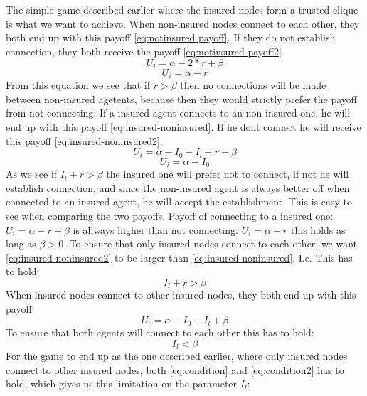 The simple game described earlier where the insured nodes form a trusted clique is what we want to achieve. 
When non-insured nodes connect to each other, they both end up with this payoff \ref{eq:notinsured payoff}. If they do not establish connection, they both receive the payoff \ref{eq:notinsured payoff2}.
\begin{equation}
U_{i}=\alpha - 2*r +\beta
\label{eq:notinsured payoff}
\end{equation}
\begin{equation}
U_{i}=\alpha - r
\label{eq:notinsured payoff2}
\end{equation}
From this equation we see that if $r>\beta$ then no connections will be made between non-insured agetents, because then they would strictly prefer the payoff from not connecting.
If a insured agent connects to an non-insured one, he will end up with this payoff \ref{eq:insured-noninsured}. If he dont connect he will receive this payoff \ref{eq:insured-noninsured2}.
\begin{equation}
U_{i}=\alpha - I_{0} - I_{l} - r + \beta
\label{eq:insured-noninsured}
\end{equation}
\begin{equation}
U_{i}=\alpha - I_{0}
\label{eq:insured-noninsured2}
\end{equation}
As we see if $I_{l}+r>\beta$ the insured one will prefer not to connect, if not he will establish connection, and since the non-insured agent is always better off when connected to an insured agent, he will accept the establishment. This is easy to see when comparing the two payoffs. Payoff of connecting to a insured one: $U_{i}=\alpha - r + \beta$ is allways higher than not connecting: $U_{i}=\alpha - r$ this holds as long as $\beta>0$.
To ensure that only insured nodes connect to each other, we want \ref{eq:insured-noninsured2} to be larger than \ref{eq:insured-noninsured}. I.e. This has to hold:
\begin{equation}
I_{l}+r>\beta
\label{eq:condition}
\end{equation}
When insured nodes connect to other insured nodes, they both end up with this payoff:
\begin{equation}
U_{i}=\alpha - I_{0} - I_{l} + \beta
\label{eq:insured-insured}
\end{equation}
To ensure that both agents will connect to each other this has to hold:
 \begin{equation}
I_{l}<\beta
\label{eq:condition2}
\end{equation}
For the game to end up as the one described earlier, where only insured nodes connect to other insured nodes, both \ref{eq:condition} and \ref{eq:condition2} has to hold, which gives us this limitation on the parameter $I_{l}$:
